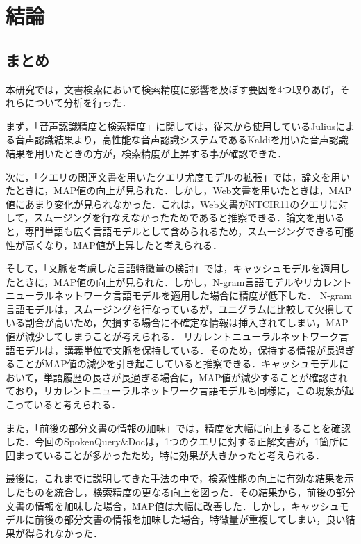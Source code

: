 
\chapter{結論} 
\section{まとめ}
本研究では，文書検索において検索精度に影響を及ぼす要因を4つ取りあげ，それらについて分析を行った．

まず，「音声認識精度と検索精度」に関しては，従来から使用しているJuliusによる音声認識結果より，高性能な音声認識システムであるKaldiを用いた音声認識結果を用いたときの方が，検索精度が上昇する事が確認できた．

次に，「クエリの関連文書を用いたクエリ尤度モデルの拡張」では，論文を用いたときに，MAP値の向上が見られた．しかし，Web文書を用いたときは，MAP値にあまり変化が見られなかった．これは，Web文書がNTCIR11のクエリに対して，スムージングを行なえなかったためであると推察できる．論文を用いると，専門単語も広く言語モデルとして含められるため，スムージングできる可能性が高くなり，MAP値が上昇したと考えられる．

そして，「文脈を考慮した言語特徴量の検討」では，キャッシュモデルを適用したときに，MAP値の向上が見られた．しかし，N-gram言語モデルやリカレントニューラルネットワーク言語モデルを適用した場合に精度が低下した．
N-gram言語モデルは，スムージングを行なっているが，ユニグラムに比較して欠損している割合が高いため，欠損する場合に不確定な情報は挿入されてしまい，MAP値が減少してしまうことが考えられる．
リカレントニューラルネットワーク言語モデルは，講義単位で文脈を保持している．そのため，保持する情報が長過ぎることがMAP値の減少を引き起こしていると推察できる．キャッシュモデルにおいて，単語履歴の長さが長過ぎる場合に，MAP値が減少することが確認されており，リカレントニューラルネットワーク言語モデルも同様に，この現象が起こっていると考えられる．

また，「前後の部分文書の情報の加味」では，精度を大幅に向上することを確認した．今回のSpokenQuery\&Docは，1つのクエリに対する正解文書が，1箇所に固まっていることが多かったため，特に効果が大きかったと考えられる．

最後に，これまでに説明してきた手法の中で，検索性能の向上に有効な結果を示したものを統合し，検索精度の更なる向上を図った．その結果から，前後の部分文書の情報を加味した場合，MAP値は大幅に改善した．しかし，キャッシュモデルに前後の部分文書の情報を加味した場合，特徴量が重複してしまい，良い結果が得られなかった．

